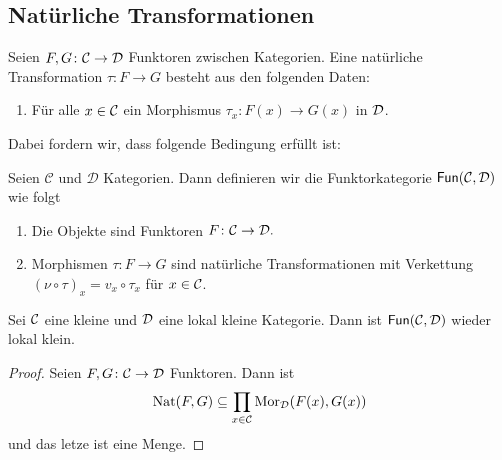 \subsection{Natürliche Transformationen}
\begin{Def}
    Seien \(F,G\colon\mathcal{C}\to\mathcal{D}\) Funktoren zwischen Kategorien. Eine natürliche Transformation \(\tau\colon F\to G\) besteht aus den folgenden Daten:
    \begin{enumerate}
        \item Für alle \(x\in\mathcal{C}\) ein Morphismus \(\tau_x\colon F(x)\to G(x)\) in \(\mathcal{D}\).
    \end{enumerate}
\end{Def}
Dabei fordern wir, dass folgende Bedingung erfüllt ist:
\begin{Def}[Funktorkategorie]
    Seien \(\mathcal{C}\) und \(\mathcal{D}\) Kategorien. Dann definieren wir die Funktorkategorie \(\mathsf{Fun}(\mathcal{C},\mathcal{D})\) wie folgt
    \begin{enumerate}
        \item Die Objekte sind Funktoren \(F\colon \mathcal{C}\to\mathcal{D}.\)
        \item Morphismen \(\tau\colon F\to G\) sind natürliche Transformationen  mit Verkettung \((\nu\circ \tau)_x=v_x\circ\tau_x\) für \(x\in\mathcal{C}\).
    \end{enumerate}
\end{Def}
\begin{Lemma}
    Sei \(\mathcal{C}\) eine kleine und \(\mathcal{D}\) eine lokal kleine Kategorie. Dann ist \(\mathsf{Fun}(\mathcal{C},\mathcal{D})\) wieder lokal klein.
\end{Lemma}
\begin{proof}
    Seien \(F,G\colon\mathcal{C}\to\mathcal{D}\) Funktoren. Dann ist 
    \[\operatorname{Nat}(F,G)\subseteq \prod_{x\in\mathcal{C}}\operatorname{Mor}_{\mathcal{D}}(F(x),G(x))\] und das letze ist eine Menge.
\end{proof}
